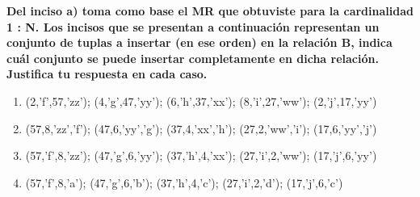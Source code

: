 \textbf{Del inciso a) toma como base el MR que obtuviste para la cardinalidad 1 : N. Los incisos que se presentan a
continuación representan un conjunto de tuplas a insertar (en ese orden) en la relación B, indica cuál conjunto se
puede insertar completamente en dicha relación. Justifica tu respuesta en cada caso.}\vspace{.3cm}

\begin{enumerate}
    \item (2,’f’,57,’zz’); (4,’g’,47,’yy’); (6,’h’,37,’xx’); (8,’i’,27,’ww’); (2,’j’,17,’yy’)
    \item (57,8,’zz’,’f’); (47,6,’yy’,’g’); (37,4,’xx’,’h’); (27,2,’ww’,’i’); (17,6,’yy’,’j’)
    \item (57,’f’,8,’zz’); (47,’g’,6,’yy’); (37,’h’,4,’xx’); (27,’i’,2,’ww’); (17,’j’,6,’yy’)
    \item (57,’f’,8,’a’); (47,’g’,6,’b’); (37,’h’,4,’c’); (27,’i’,2,’d’); (17,’j’,6,’c’)
\end{enumerate}

\vspace{.5cm}